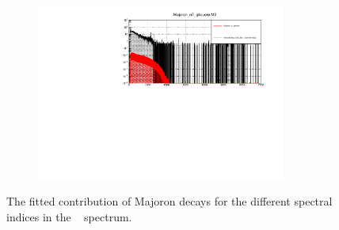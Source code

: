 \begin{figure}[htbp]
\begin{subfigure}[t]{0.49\linewidth}
\end{subfigure}
\qqad
\begin{subfigure}[t]{0.49\linewidth}
\includegraphics[width=0.9\textwidth]{Figures/Majoron_n7_g4cuore_M2.pdf}
\end{subfigure}
\caption[The fitted contribution of Majoron decays for the different spectral indices in the \Mtwo~ spectrum.]{The fitted contribution of Majoron decays for the different spectral indices in the \Mtwo~ spectrum.}
\label{fig:SpectralIndicesM2Fit}
\end{figure}
